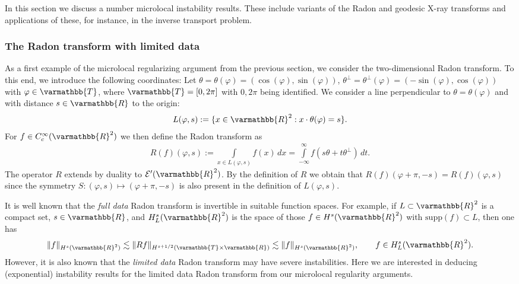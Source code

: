 \documentclass[12pt,twoside]{amsart}
\numberwithin{equation}{section}
\renewcommand{\mathbb}{\varmathbb}
\newcommand {\R} {\mathbb{R}} \newcommand {\Z} {\mathbb{Z}}
\newcommand {\T} {\mathbb{T}} \newcommand {\N} {\mathbb{N}}
\newcommand{\mR}{\mathbb{R}}                    %
\newcommand{\norm}[1]{\lVert #1 \rVert}         %
\begin{document}
In this section we discuss a number microlocal instability results. These include variants of the Radon and geodesic X-ray transforms and applications of these, for instance, in the inverse transport problem. 






\subsubsection{The Radon transform with limited data}

As a first example of the microlocal regularizing argument from the previous section, we consider the two-dimensional Radon transform. To this end, we introduce the following coordinates: Let $\theta=\theta(\varphi)=(\cos(\varphi),\sin(\varphi))$, $\theta^{\perp}=\theta^{\perp}(\varphi)=(-\sin(\varphi),\cos(\varphi))$ with $\varphi \in \T$, where $\T=[0,2\pi]$ with $0,2\pi$ being identified. We consider a line perpendicular to $\theta=\theta(\varphi)$ and with distance $s \in \R$ to the origin: 
\begin{align*}
L(\varphi, s):=\{x\in \R^2: x\cdot \theta(\varphi)=s\}.
\end{align*}
For $f\in C^{\infty}_c(\R^2)$ we then define the Radon transform as 
\begin{align}
\label{eq:Radon}
R(f)(\varphi,s):= \int\limits_{x\in L(\varphi,s)}f(x) \,dx = \int\limits_{-\infty}^{\infty} f(s \theta + t \theta^{\perp}) \,dt.
\end{align}
The operator $R$ extends by duality to $\mathcal{E}'(\mR^2)$. By the definition of $R$ we obtain that $R(f)(\varphi + \pi, -s) = R(f)(\varphi,s)$ since the symmetry $S: (\varphi,s)\mapsto (\varphi + \pi,-s)$ is also present in the definition of $L(\varphi,s)$.

It is well known that the \emph{full data} Radon transform is invertible in suitable function spaces. For example, if $L \subset \mR^2$ is a compact set, $s \in \mR$, and $H^s_L(\mR^2)$ is the space of those $f \in H^s(\mR^2)$ with $\mathrm{supp}(f) \subset L$, then one has \cite[Theorem II.5.1]{Natterer_book}
\[
\norm{f}_{H^s(\mR^2)} \lesssim \norm{Rf}_{H^{s+1/2}(\T \times \mR)} \lesssim \norm{f}_{H^s(\mR^2)}, \qquad f \in H^s_L(\mR^2).
\]
However, it is also known that the \emph{limited data} Radon transform may have severe instabilities.
Here we are interested in deducing (exponential) instability results for the limited data Radon transform from our microlocal regularity arguments.
\end{document}
